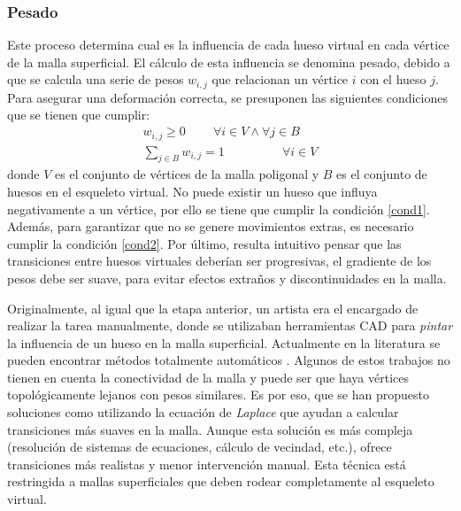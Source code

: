 \subsubsection{Pesado}
\label{art:pesado}

Este proceso  determina cual es la influencia de cada hueso virtual en cada vértice de la malla superficial. El cálculo de esta influencia se denomina pesado, debido a que se calcula una serie de pesos $w_{i,j}$ que relacionan un vértice $i$ con el hueso $j$.
Para asegurar una deformación correcta, se presuponen las siguientes condiciones que se tienen que cumplir:
\begin{eqnarray}
\label{cond1}
w_{i,j}\geq 0 \;\;\;\;\;\;\;\; \forall i \in V \wedge \forall j \in B   \\
\label{cond2}
\sum_{j \in B} w_{i,j} = 1\ \;\;\;\;\;\;\;\;\;\;\;\;\;\;\;\;
\forall i \in V
\end{eqnarray}
donde $V$ es el conjunto de vértices de la malla poligonal y $B$ es el conjunto de huesos en el esqueleto virtual. No puede existir un hueso que influya negativamente a un vértice, por ello se tiene que cumplir la condición \ref{cond1}. Además, para garantizar que no se genere movimientos extras, es necesario cumplir la condición \ref{cond2}.
Por último, resulta intuitivo pensar que las transiciones entre huesos virtuales deberían ser progresivas, el gradiente de los pesos debe ser suave, para evitar efectos extraños y discontinuidades en la malla.

Originalmente, al igual que la etapa anterior, un artista era el encargado de realizar la tarea manualmente, donde se utilizaban herramientas \ac{CAD} para \emph{pintar} la influencia de un hueso en la malla superficial. Actualmente en la literatura se pueden encontrar métodos totalmente automáticos \cite{huang2013robust,pan2017automatic}. 
Algunos de estos trabajos no tienen en cuenta la conectividad de la malla y puede ser que haya vértices topológicamente lejanos con pesos similares. Es por eso, que se han propuesto soluciones como \cite{Baran:2007} utilizando la ecuación de \emph{Laplace} que ayudan a calcular transiciones más suaves en la malla. Aunque esta solución es más compleja (resolución de sistemas de ecuaciones, cálculo de vecindad, etc.), ofrece transiciones más realistas y menor intervención manual. Esta técnica está restringida a mallas superficiales que deben rodear completamente al esqueleto virtual.

